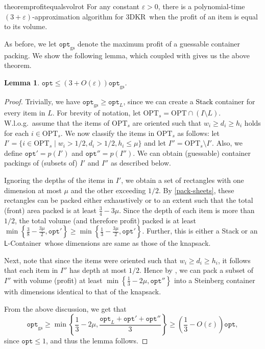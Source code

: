 \documentclass[10pt,a4paper]{amsart}
\newcommand{\kvnnew}[1]{\textcolor{black}{#1}}
\newcommand{\kvnr}[1]{}
\newcommand{\eps}{\varepsilon}
\renewcommand{\epsilon}{\varepsilon} %
\newcommand{\tdkr}{\textsc{3DKR}}
\newtheorem{lemma}[theorem]{Lemma}
\theoremstyle{definition}
\newcommand{\alg}{\mathtt{opt}_{\mathrm{gs}}}
\newcommand{\opt}{\mathtt{opt}}
\newcommand{\LContainer}{$\mathsf{L}$-Container}
\begin{document}
\begin{restatable}{theorem}{profitequalsvolrot}
    \label{thm:r3dkrp}
   For any constant $\eps>0$, there is a polynomial-time $(3 +\eps)$-approximation algorithm for \tdkr~when the profit of an item is equal to its volume.  
\end{restatable}

As before, we let $\alg$ denote the maximum profit of a guessable container packing. We show the following lemma, which coupled with  gives us the above theorem.

\begin{lemma}
    $\opt \le (3+O(\epsilon))\alg$.
\end{lemma}
\begin{proof}
    Trivially, we have $\alg \ge \opt_L$, since we can create a \kvnnew{Stack} container for every item in $L$. For brevity of notation, let $\text{OPT}_s = \text{OPT}\cap (I\setminus L)$. W.l.o.g.~assume that the items of $\text{OPT}_s$ are oriented such that $w_i \ge d_i \ge h_i$ holds for each $i\in \text{OPT}_s$. We now classify the items in $\text{OPT}_s$ as follows: let $I' = \{i \in \text{OPT}_s \mid w_i > 1/2, d_i > 1/2, h_i \le \mu\}$ and let $I'' = \text{OPT}_s \setminus I'$. Also, we define $\opt' = p(I')$ and $\opt'' = p(I'')$. We can obtain (guessable) container packings of (subsets of) $I'$ and $I''$ as described below.

    Ignoring the depths of the items in $I'$, we obtain a set of rectangles with one dimension at most $\mu$ and the other exceeding $1/2$. By \cref{pack-sheets}, these rectangles can be packed either exhaustively or to an extent such that the total (front) area packed is at least $\frac{3}{4}-3\mu$. Since the depth of each item is more than $1/2$, the total volume (and therefore profit) packed is at least $\min\left\{\frac{3}{8}-\frac{3\mu}{2},\opt'\right\}\ge\min\left\{\frac{1}{3}-\frac{3\mu}{2},{\opt'}\right\}$. Further, this is either a Stack or an \LContainer~whose dimensions are same as those of the knapsack.
\kvnr{I am changing this from $\frac38$ to $\frac13$.}
    Next, note that since the items were oriented such that $w_i \ge d_i \ge h_i$, it follows that each item in $I''$ has depth at most $1/2$. Hence by , we can pack a subset of $I''$ with volume (profit) at least $\min\left\{\frac{1}{3}-2\mu, \opt''\right\}$ into a Steinberg container with dimensions identical to that of the knapsack.

    From the above discussion, we get that
    \[ \alg \ge \min\left\{\frac13-2\mu,\frac{{\opt_L}+{\opt'}+{\opt''}}{3}\right\} \ge \left(\frac{1}{3}-O(\epsilon)\right)\opt,\]
    since $\opt\le 1$, and thus the lemma follows.
\end{proof}
\end{document}
